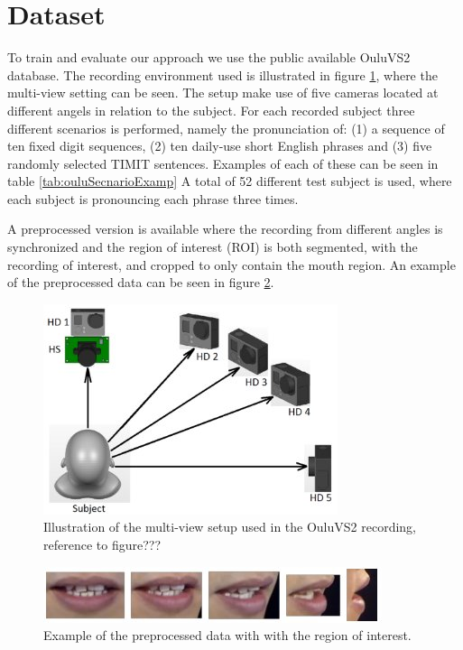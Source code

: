 \section{Dataset}
\label{sec:dataset}
To train and evaluate our approach we use the public available OuluVS2 database.
The recording environment used is illustrated in figure \ref{fig:ouluMultiView}, where the multi-view setting can be seen.
The setup make use of five cameras located at different angels in relation to the subject.
For each recorded subject three different scenarios is performed, namely the pronunciation of: 
(1) a sequence of ten fixed digit sequences,
(2) ten daily-use short English phrases and
(3) five randomly selected TIMIT sentences.
Examples of each of these can be seen in table \ref{tab:ouluSecnarioExamp}
A total of 52 different test subject is used, where each subject is pronouncing each phrase three times.

A preprocessed version is available where the recording from different angles is synchronized and the region of interest (ROI) is both segmented, with the recording of interest, and cropped to only contain the mouth region.
An example of the preprocessed data can be seen in figure \ref{fig:ouluPreprocessed}.

\begin{figure}
    \centering
    \includegraphics[width=0.6\columnwidth]{fig/ouluMultiView.jpg}
    \caption{Illustration of the multi-view setup used in the OuluVS2 recording, reference to figure???}
    \label{fig:ouluMultiView}
\end{figure}
\begin{figure}
    \centering
    \includegraphics[width=\columnwidth]{fig/ouluPreprocessed.jpg}
    \caption{Example of the preprocessed data with with the region of interest.}
    \label{fig:ouluPreprocessed}
\end{figure}

